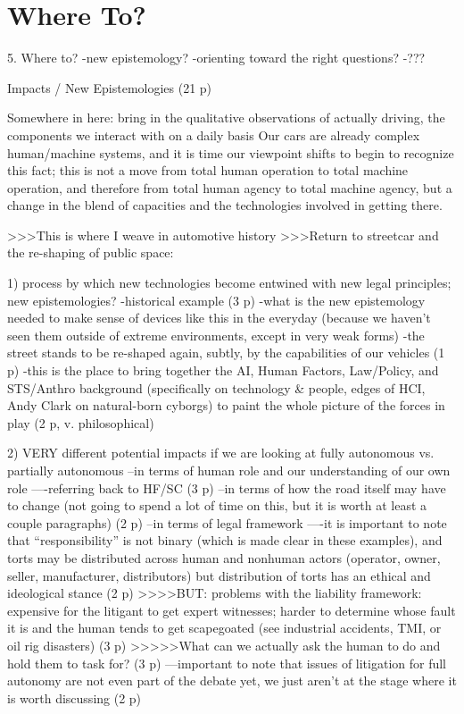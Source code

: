 \chapter{Where To?}

5. Where to?
-new epistemology?
-orienting toward the right questions?
-???

Impacts / New Epistemologies (21 p)

Somewhere in here:
bring in the qualitative observations of actually driving, the
components we interact with on a daily basis
Our cars are already complex human/machine systems, and it is time our
viewpoint shifts to begin to recognize this fact; this is not a move
from total human operation to total machine operation, and therefore
from total human agency to total machine agency, but a change in the
blend of capacities and the technologies involved in getting there.



>>>This is where I weave in automotive history 
>>>Return to streetcar and the re-shaping of public space: 

1) process by which new technologies become entwined with new legal
principles; new epistemologies?
-historical example (3 p)
-what is the new epistemology needed to make sense of devices like
this in the everyday (because we haven't seen them outside of extreme
environments, except in very weak forms)
-the street stands to be re-shaped again, subtly, by the capabilities
of our vehicles (1 p)
-this is the place to bring together the AI, Human Factors,
Law/Policy, and STS/Anthro background (specifically on technology \&
people, edges of HCI, Andy Clark on natural-born cyborgs) to paint the
whole picture of the forces in play (2 p, v. philosophical)

2) VERY different potential impacts if we are looking at fully
autonomous vs. partially autonomous 
--in terms of human role and our understanding of our own role
----referring back to HF/SC (3 p)
--in terms of how the road itself may have to change (not going to
spend a lot of time on this, but it is worth at least a couple
paragraphs) (2 p)
--in terms of legal framework
----it is important to note that ``responsibility'' is not binary
(which is made clear in these examples), and torts may be distributed
across human and nonhuman actors (operator, owner, seller,
manufacturer, distributors) but distribution of torts has an ethical
and ideological stance (2 p)
>>>>BUT: problems with the liability framework: expensive for the
litigant to get expert witnesses; harder to determine whose fault it
is and the human tends to get scapegoated (see industrial accidents,
TMI, or oil rig disasters) (3 p)
>>>>>What can we actually ask the human to do and hold them to task
for? (3 p)
---important to note that issues of litigation for full autonomy are
not even part of the debate yet, we just aren't at the stage where it
is worth discussing (2 p)

